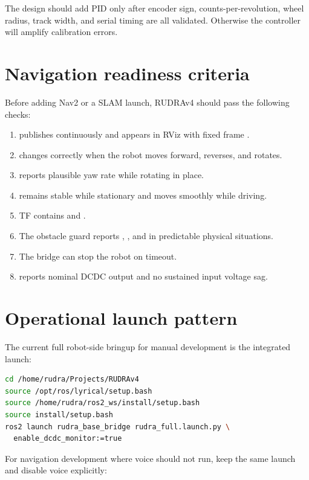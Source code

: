 The design should add PID only after encoder sign, counts-per-revolution, wheel radius,
track width, and serial timing are all validated. Otherwise the controller will amplify
calibration errors.

\section{Navigation readiness criteria}

Before adding Nav2 or a SLAM launch, RUDRAv4 should pass the following checks:

\begin{enumerate}
  \item {} publishes continuously and appears in RViz with fixed frame .
  \item {} changes correctly when the robot moves forward, reverses, and rotates.
  \item {} reports plausible yaw rate while rotating in place.
  \item {} remains stable while stationary and moves smoothly while driving.
  \item TF contains  and .
  \item The obstacle guard reports , , and  in predictable physical situations.
  \item The  bridge can stop the robot on timeout.
  \item {} reports nominal DCDC output and no sustained input voltage sag.
\end{enumerate}

\section{Operational launch pattern}

The current full robot-side bringup for manual development is the integrated launch:

\begin{lstlisting}[language=bash]
cd /home/rudra/Projects/RUDRAv4
source /opt/ros/lyrical/setup.bash
source /home/rudra/ros2_ws/install/setup.bash
source install/setup.bash
ros2 launch rudra_base_bridge rudra_full.launch.py \
  enable_dcdc_monitor:=true
\end{lstlisting}

For navigation development where voice should not run, keep the same launch and disable voice explicitly:

